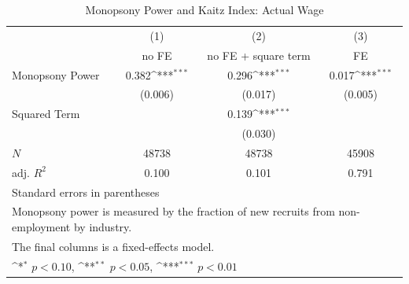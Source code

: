 \begin{table}[htbp]\centering
\def\sym#1{\ifmmode^{#1}\else\(^{#1}\)\fi}
\caption{Monopsony Power and Kaitz Index: Actual Wage}
\begin{tabular}{l*{3}{c}}
\hline\hline
            &\multicolumn{1}{c}{(1)}&\multicolumn{1}{c}{(2)}&\multicolumn{1}{c}{(3)}\\
            &\multicolumn{1}{c}{no FE}&\multicolumn{1}{c}{no FE + square term}&\multicolumn{1}{c}{FE}\\
\hline
Monopsony Power&       0.382\sym{***}&       0.296\sym{***}&       0.017\sym{***}\\
            &     (0.006)         &     (0.017)         &     (0.005)         \\
[1em]
Squared Term&                     &       0.139\sym{***}&                     \\
            &                     &     (0.030)         &                     \\
\hline
\(N\)       &       48738         &       48738         &       45908         \\
adj. \(R^{2}\)&       0.100         &       0.101         &       0.791         \\
\hline\hline
\multicolumn{4}{l}{\footnotesize Standard errors in parentheses}\\
\multicolumn{4}{l}{\footnotesize Monopsony power is measured by the fraction of new recruits from non-employment by industry.}\\
\multicolumn{4}{l}{\footnotesize The final columns is a fixed-effects model.}\\
\multicolumn{4}{l}{\footnotesize \sym{*} \(p<0.10\), \sym{**} \(p<0.05\), \sym{***} \(p<0.01\)}\\
\end{tabular}
\end{table}
